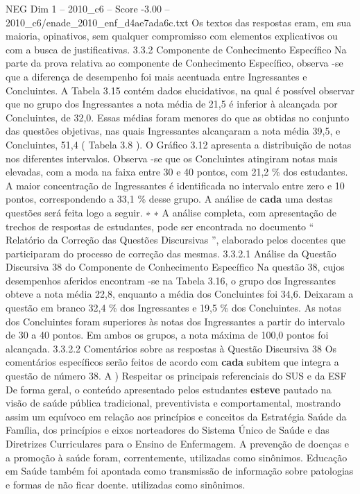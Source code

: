 \begin{textsample}{NEG Dim 1 – 2010\_c6 – Score -3.00 – 2010\_c6/enade\_2010\_enf\_d4ae7ada6c.txt}
Os textos das respostas eram, em sua maioria, opinativos, sem qualquer compromisso com elementos explicativos ou com a busca de justificativas. 3.3.2 Componente de Conhecimento Específico Na parte da prova relativa ao componente de Conhecimento Específico, observa -se que a diferença de desempenho foi mais acentuada entre Ingressantes e Concluintes.
A Tabela 3.15 contém dados elucidativos, na qual é possível observar que no grupo dos Ingressantes a nota média de 21,5 é inferior à alcançada por Concluintes, de 32,0.
Essas médias foram menores do que as obtidas no conjunto das questões objetivas, nas quais Ingressantes alcançaram a nota média 39,5, e Concluintes, 51,4 ( Tabela 3.8 ).
O Gráfico 3.12 apresenta a distribuição de notas nos diferentes intervalos.
Observa -se que os Concluintes atingiram notas mais elevadas, com a moda na faixa entre 30 e 40 pontos, com 21,2 \% dos estudantes.
A maior concentração de Ingressantes é identificada no intervalo entre zero e 10 pontos, correspondendo a 33,1 \% desse grupo.
A análise de \textbf{cada} uma destas questões será feita logo a seguir. ∗ ∗ A análise completa, com apresentação de trechos de respostas de estudantes, pode ser encontrada no documento “ Relatório da Correção das Questões Discursivas ”, elaborado pelos docentes que participaram do processo de correção das mesmas. 3.3.2.1 Análise da Questão Discursiva 38 do Componente de Conhecimento Específico Na questão 38, cujos desempenhos aferidos encontram -se na Tabela 3.16, o grupo dos Ingressantes obteve a nota média 22,8, enquanto a média dos Concluintes foi 34,6.
Deixaram a questão em branco 32,4 \% dos Ingressantes e 19,5 \% dos Concluintes.
As notas dos Concluintes foram superiores às notas dos Ingressantes a partir do intervalo de 30 a 40 pontos.
Em ambos os grupos, a nota máxima de 100,0 pontos foi alcançada. 3.3.2.2 Comentários sobre as respostas à Questão Discursiva 38 Os comentários específicos serão feitos de acordo com \textbf{cada} subitem que integra a questão de número 38.
A ) Respeitar os principais referenciais do SUS e da ESF De forma geral, o conteúdo apresentado pelos estudantes \textbf{esteve} pautado na visão de saúde pública tradicional, preventivista e comportamental, mostrando assim um equívoco em relação aos princípios e conceitos da Estratégia Saúde da Família, dos princípios e eixos norteadores do Sistema Único de Saúde e das Diretrizes Curriculares para o Ensino de Enfermagem.
A prevenção de doenças e a promoção à saúde foram, correntemente, utilizadas como sinônimos.
Educação em Saúde também foi apontada como transmissão de informação sobre patologias e formas de não ficar doente. utilizadas como sinônimos.

\end{textsample}
